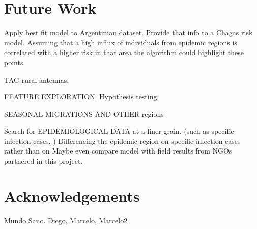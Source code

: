 \section{Future Work}
Apply best fit model to Argentinian dataset. Provide that info to a Chagas risk model. Assuming that a high influx of individuals from epidemic regions is correlated with a higher risk in that area the algorithm could highlight these points.

TAG rural antennas.

FEATURE EXPLORATION. Hypothesis testing. 

SEASONAL MIGRATIONS AND OTHER regions

Search for EPIDEMIOLOGICAL DATA at a finer grain. (such as specific infection cases, ) Differencing the epidemic region on specific infection cases rather than on
Maybe even compare model with field results from NGOs partnered in this project.

\section{Acknowledgements}
Mundo Sano. Diego, Marcelo, Marcelo2